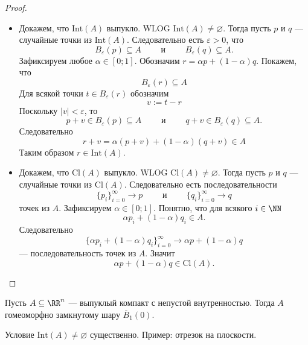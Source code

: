 \documentclass[12pt,a4paper]{article}
\newcommand{\Int}{\ensuremath{\mathrm{Int}}\xspace}
\newcommand{\Cl}{\ensuremath{\mathrm{Cl}}\xspace}
\begin{document}
    \begin{proof}
        \begin{itemize}
            \item Докажем, что $\Int(A)$ выпукло. WLOG $\Int(A) \neq \varnothing$. Тогда пусть $p$ и $q$ --- случайные точки из $\Int(A)$. Следовательно есть $\varepsilon > 0$, что
                \[
                    B_\varepsilon(p) \subseteq A
                    \qquad \text{ и } \qquad
                    B_\varepsilon(q) \subseteq A.
                \]
                Зафиксируем любое $\alpha \in [0; 1]$. Обозначим $r = \alpha p + (1-\alpha) q$. Покажем, что 
                \[B_\varepsilon(r) \subseteq A\]
                Для всякой точки $t \in B_\varepsilon(r)$ обозначим
                \[v := t - r\]
                Поскольку $|v| < \varepsilon$, то
                \[
                    p + v \in B_\varepsilon(p) \subseteq A
                    \qquad \text{ и } \qquad
                    q + v \in B_\varepsilon(q) \subseteq A.
                \]
                Следовательно
                \[r + v = \alpha (p + v) + (1-\alpha) (q + v) \in A\]
                Таким образом $r \in \Int(A)$.

            \item Докажем, что $\Cl(A)$ выпукло. WLOG $\Cl(A) \neq \varnothing$. Тогда пусть $p$ и $q$ --- случайные точки из $\Cl(A)$. Следовательно есть последовательности
                \[
                    \{p_i\}_{i=0}^\infty \to p
                    \qquad \text{ и } \qquad
                    \{q_i\}_{i=0}^\infty \to q
                \]
                точек из $A$. Зафиксируем $\alpha \in [0; 1]$. Понятно, что для всякого $i \in \NN$
                \[\alpha p_i + (1-\alpha) q_i \in A.\]
                Следовательно
                \[\{\alpha p_i + (1-\alpha) q_i\}_{i=0}^\infty \to \alpha p + (1-\alpha) q\]
                --- последовательность точек из $A$. Значит
                \[\alpha p + (1-\alpha) q \in \Cl(A).\]
        \end{itemize}
    \end{proof}

    \begin{theorem}
        Пусть $A \subseteq \RR^n$ --- выпуклый компакт с непустой внутренностью. Тогда $A$ гомеоморфно замкнутому шару $\overline{B}_1(0)$.
    \end{theorem}

    \begin{remark}
        Условие $\Int(A) \neq \varnothing$ существенно. Пример: отрезок на плоскости.
    \end{remark}
\end{document}
